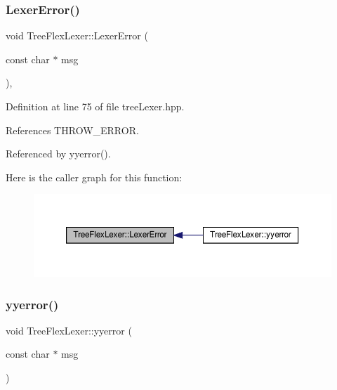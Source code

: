 \mbox{\label{structTreeFlexLexer_a29c958363809be1af8fd3ba2fd8da884}} 
\subsubsection{\texorpdfstring{Lexer\+Error()}{LexerError()}}
{\footnotesize\ttfamily void Tree\+Flex\+Lexer\+::\+Lexer\+Error (\begin{DoxyParamCaption}\item[{const char $\ast$}]{msg }\end{DoxyParamCaption})\hspace{0.3cm}{\ttfamily [inline]}, {\ttfamily [override]}}



Definition at line 75 of file tree\+Lexer.\+hpp.



References T\+H\+R\+O\+W\+\_\+\+E\+R\+R\+OR.



Referenced by yyerror().

Here is the caller graph for this function\+:
\nopagebreak
\begin{figure}[H]
\begin{center}
\leavevmode
\includegraphics[width=350pt]{d8/d95/structTreeFlexLexer_a29c958363809be1af8fd3ba2fd8da884_icgraph}
\end{center}
\end{figure}
\mbox{\label{structTreeFlexLexer_a71d99188f7a9917d25163f47743a8a44}} 
\subsubsection{\texorpdfstring{yyerror()}{yyerror()}}
{\footnotesize\ttfamily void Tree\+Flex\+Lexer\+::yyerror (\begin{DoxyParamCaption}\item[{const char $\ast$}]{msg }\end{DoxyParamCaption})\hspace{0.3cm}{\ttfamily [inline]}}



